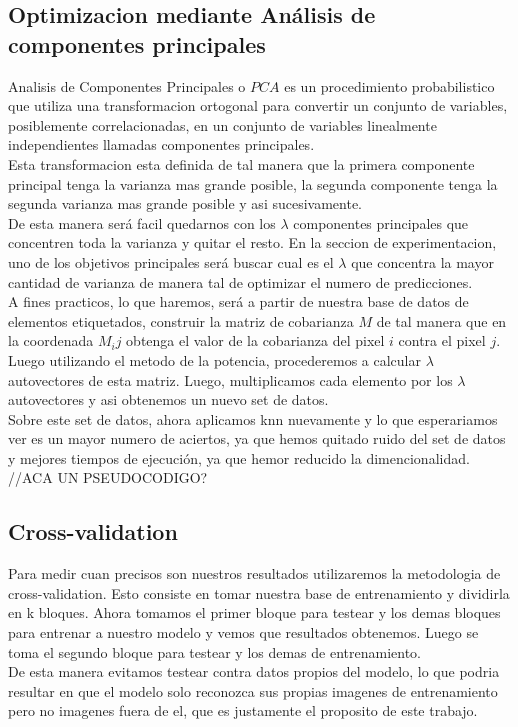 \subsection{Optimizacion mediante An\'alisis de componentes principales}
Analisis de Componentes Principales o $PCA$ es un procedimiento probabilistico que utiliza una transformacion ortogonal para convertir un conjunto de variables, posiblemente correlacionadas, en un conjunto de variables linealmente independientes llamadas componentes principales.
\\
Esta transformacion esta definida de tal manera que la primera componente principal tenga la varianza mas grande posible, la segunda componente tenga la segunda varianza mas grande posible y asi sucesivamente.
\\
De esta manera será facil quedarnos con los $\lambda$ componentes principales que concentren toda la varianza y quitar el resto. En la seccion de experimentacion, uno de los objetivos principales será buscar cual es el $\lambda$ que concentra la mayor cantidad de varianza de manera tal de optimizar el numero de predicciones. 
\\
A fines practicos, lo que haremos, será a partir de nuestra base de datos de elementos etiquetados, construir la matriz  de cobarianza $M$ de tal manera que en la coordenada $M_ij$ obtenga el valor de la cobarianza del pixel $i$ contra el pixel $j$.
\\
Luego utilizando el metodo de la potencia, procederemos a calcular $\lambda$ autovectores de esta matriz. Luego, multiplicamos cada elemento por los $\lambda$ autovectores y asi obtenemos un nuevo set de datos.
\\
Sobre este set de datos, ahora aplicamos knn nuevamente y lo que esperariamos ver es un mayor numero de aciertos, ya que hemos quitado ruido del set de datos y mejores tiempos de ejecución, ya que hemor reducido la dimencionalidad.
\\
//ACA UN PSEUDOCODIGO?

\subsection{Cross-validation}
Para medir cuan precisos son nuestros resultados utilizaremos la metodologia de cross-validation. Esto consiste en tomar nuestra base de entrenamiento y dividirla en k bloques. Ahora tomamos el primer bloque para testear y los demas bloques para entrenar a nuestro modelo y vemos que resultados obtenemos. Luego se toma el segundo bloque para testear y los demas de entrenamiento.
\\
De esta manera evitamos testear contra datos propios del modelo, lo que podria resultar en que el modelo solo reconozca sus propias imagenes de entrenamiento pero no imagenes fuera de el, que es justamente el proposito de este trabajo.